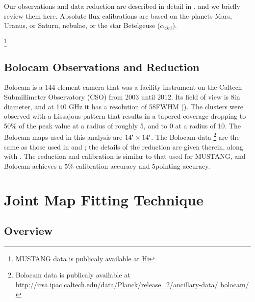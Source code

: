 \documentclass[iop,numberedappendix,apj]{emulateapj}
\begin{document}
Our observations and data reduction are described in detail in \citet{romero2015a}, and we briefly review them
here. Absolute flux calibrations are based on the planets Mars, Uranus, or Saturn, nebulae, or the star Betelgeuse 
($\alpha_{Ori}$).

\footnote{MUSTANG data is publicaly available at 
\href{http://irsa.ipac.caltech.edu/data/Planck/release\_2/ancillary-data/bolocam/}{Hi}}

\subsection{Bolocam Observations and Reduction}
\label{sec:bolocamobs}

Bolocam is a 144-element camera that was a facility instrument on the Caltech Submillimeter Observatory (CSO) from
2003 until 2012. Its field of view is 8\amins in diameter, and at 140 GHz it has a resolution of 58\asecs FWHM
(\citet{glenn1998,haig2004}). The clusters were observed with a Lissajous pattern that results in a tapered
coverage dropping to 50\% of the peak value at a radius of roughly 5\amin, and to 0 at a radius of 10\amin.
The Bolocam maps used in this analysis are $14\mbox{$^\prime$} \times 14\mbox{$^\prime$}$. The Bolocam data 
\footnote{Bolocam data is publicaly available at 
\href{http://irsa.ipac.caltech.edu/data/Planck/release\_2/ancillary-data/bolocam/}
{http://irsa.ipac.caltech.edu/data/Planck/release\_2/ancillary-data/} 
\href{http://irsa.ipac.caltech.edu/data/Planck/release\_2/ancillary-data/bolocam/}{bolocam/}}
are the same as those used in \citet{czakon2015} and \citet{sayers2013}; the details of the reduction are 
given therein, along with \citet{sayers2011}. 
The reduction and calibration is similar to that used for MUSTANG, and Bolocam achieves a 
5\% calibration accuracy and 5\asecs pointing accuracy.


\section{Joint Map Fitting Technique}
\label{sec:jointfitting}

\subsection{Overview}
\label{sec:jf_overview}
\end{document}
